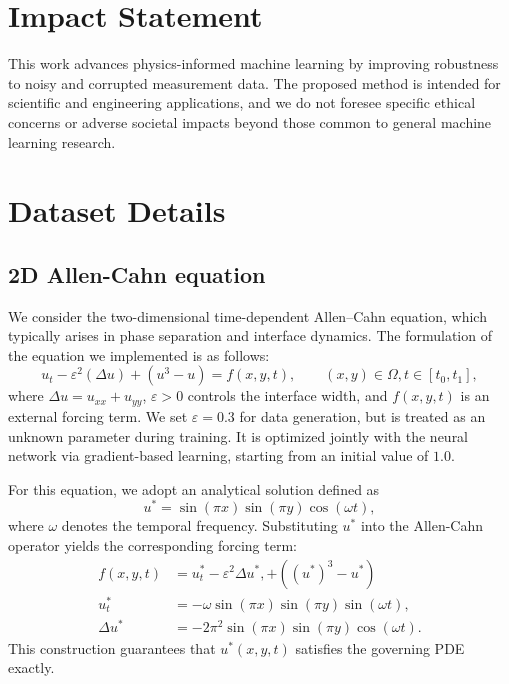 \documentclass{article}
\theoremstyle{plain}
\theoremstyle{definition}
\theoremstyle{remark}
\begin{document}
\section*{Impact Statement}

This work advances physics-informed machine learning by improving robustness to noisy and corrupted measurement data. The proposed method is intended for scientific and engineering applications, and we do not foresee specific ethical concerns or adverse societal impacts beyond those common to general machine learning research.




\medskip


\appendix

\section{Dataset Details}
\label{appendix:DatasetDetails}

\subsection{2D Allen-Cahn equation}

We consider the two-dimensional time-dependent Allen--Cahn equation, which typically arises in phase separation and interface dynamics. The formulation of the equation we implemented is as follows:
\begin{equation}
u_t - \varepsilon^2 (\Delta u) + (u^3 - u) = f(x,y,t),
\qquad (x,y) \in \Omega, t \in [t_0, t_1],
\end{equation}
where $\Delta u = u_{xx} + u_{yy}$, $\varepsilon > 0$ controls the interface width, and $f(x,y,t)$ is an external forcing term. We set $\varepsilon = 0.3$ for data generation, but is treated as an unknown parameter during training. It is optimized jointly with the neural network via gradient-based learning, starting from an initial value of $1.0$.

For this equation, we adopt an analytical solution defined as
\begin{equation}
u^* = \sin(\pi x) \sin(\pi y) \cos(\omega t),
\end{equation}
where $\omega$ denotes the temporal frequency. Substituting $u^*$ into the Allen-Cahn operator yields the corresponding forcing term:
\begin{align}
f(x,y,t) &= u^*_t - \varepsilon^2 \Delta u^*, + ((u^*)^3-u^*)\\
u^*_t &= -\omega \sin(\pi x) \sin(\pi y) \sin(\omega t), \\
\Delta u^* &= -2 \pi^2 \sin(\pi x) \sin(\pi y) \cos(\omega t).
\end{align}
This construction guarantees that $u^*(x,y,t)$ satisfies the governing PDE exactly.
\end{document}
